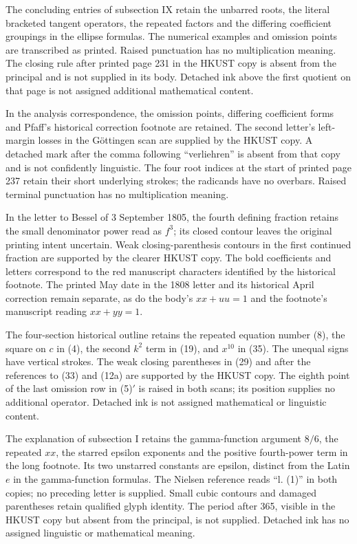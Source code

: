 The concluding entries of subsection IX retain the unbarred roots, the literal bracketed tangent operators, the repeated factors and the differing coefficient groupings in the ellipse formulas. The numerical examples and omission points are transcribed as printed. Raised punctuation has no multiplication meaning. The closing rule after printed page 231 in the HKUST copy is absent from the principal and is not supplied in its body. Detached ink above the first quotient on that page is not assigned additional mathematical content.


In the analysis correspondence, the omission points, differing coefficient forms and Pfaff’s historical correction footnote are retained. The second letter’s left-margin losses in the Göttingen scan are supplied by the HKUST copy. A detached mark after the comma following “verliehren” is absent from that copy and is not confidently linguistic. The four root indices at the start of printed page 237 retain their short underlying strokes; the radicands have no overbars. Raised terminal punctuation has no multiplication meaning.


In the letter to Bessel of 3 September 1805, the fourth defining fraction retains the small denominator power read as $f^3$; its closed contour leaves the original printing intent uncertain. Weak closing-parenthesis contours in the first continued fraction are supported by the clearer HKUST copy. The bold coefficients and letters correspond to the red manuscript characters identified by the historical footnote. The printed May date in the 1808 letter and its historical April correction remain separate, as do the body’s $xx+uu=1$ and the footnote’s manuscript reading $xx+yy=1$.


The four-section historical outline retains the repeated equation number (8), the square on $c$ in (4), the second $k^2$ term in (19), and $x^{10}$ in (35). The unequal signs have vertical strokes. The weak closing parentheses in (29) and after the references to (33) and (12a) are supported by the HKUST copy. The eighth point of the last omission row in (5)$\prime$ is raised in both scans; its position supplies no additional operator. Detached ink is not assigned mathematical or linguistic content.


The explanation of subsection I retains the gamma-function argument $8/6$, the repeated $xx$, the starred epsilon exponents and the positive fourth-power term in the long footnote. Its two unstarred constants are epsilon, distinct from the Latin $e$ in the gamma-function formulas. The Nielsen reference reads ``l. (1)'' in both copies; no preceding letter is supplied. Small cubic contours and damaged parentheses retain qualified glyph identity. The period after 365, visible in the HKUST copy but absent from the principal, is not supplied. Detached ink has no assigned linguistic or mathematical meaning.


